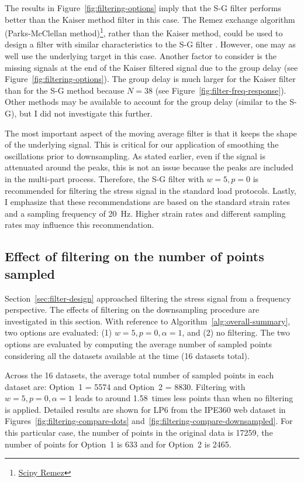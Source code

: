 \documentclass[a4paper,11pt]{article}
\begin{document}
The results in Figure~\ref{fig:filtering-options} imply that the S-G filter performs better than the Kaiser method filter in this case.
The Remez exchange algorithm (Parks-McClellan method)\footnote{\href{https://docs.scipy.org/doc/scipy/reference/generated/scipy.signal.remez.html}{Scipy Remez}}, rather than the Kaiser method, could be used to design a filter with similar characteristics to the S-G filter \citep{SchaferWhatSavitzkyGolayFilter2011}.
However, one may as well use the underlying target in this case.
Another factor to consider is the missing signals at the end of the Kaiser filtered signal due to the group delay (see Figure~\ref{fig:filtering-options}).
The group delay is much larger for the Kaiser filter than for the S-G method because $N = 38$ (see Figure~\ref{fig:filter-freq-response}).
Other methods may be available to account for the group delay (similar to the S-G), but I did not investigate this further.

The most important aspect of the moving average filter is that it keeps the shape of the underlying signal.
This is critical for our application of smoothing the oscillations prior to downsampling.
As stated earlier, even if the signal is attenuated around the peaks, this is not an issue because the peaks are included in the multi-part process.
Therefore, the S-G filter with $w = 5, p = 0$ is recommended for filtering the stress signal in the standard load protocols.
Lastly, I emphasize that these recommendations are based on the standard strain rates and a sampling frequency of 20~Hz.
Higher strain rates and different sampling rates may influence this recommendation.


\subsection{Effect of filtering on the number of points sampled}

Section~\ref{sec:filter-design} approached filtering the stress signal from a frequency perspective.
The effects of filtering on the downsampling procedure are investigated in this section.
With reference to Algorithm~\ref{alg:overall-summary}, two options are evaluated: (1) $w = 5, p = 0, \alpha = 1$, and (2) no filtering.
The two options are evaluated by computing the average number of sampled points considering all the datasets available at the time (16 datasets total).

Across the 16 datasets, the average total number of sampled points in each dataset are: Option~1 = 5574 and Option~2 = 8830.
Filtering with $w = 5, p = 0, \alpha = 1$ leads to around 1.58~times less points than when no filtering is applied.
Detailed results are shown for LP6 from the IPE360 web dataset in Figures~\ref{fig:filtering-compare-dots} and~\ref{fig:filtering-compare-downsampled}.
For this particular case, the number of points in the original data is 17259, the number of points for Option~1 is 633 and for Option~2 is 2465.
\end{document}
